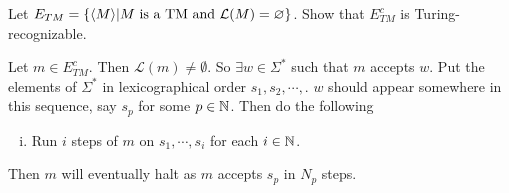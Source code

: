 \begin{problem}[Sipser]
	Let $ E_{TM} = \{\langle M\rangle|\text{$ M $ is a TM and $ \mathcal{L}(M)=\varnothing $}\}$. Show that $ E_{TM}^c $ is Turing-recognizable.
\end{problem}
\begin{solution}
	Let $ m \in E_{TM}^c $. Then $ \mathcal{L}(m) \neq \emptyset $. So $ \exists w \in \Sigma^* $ such that $ m $ accepts $ w $. Put the elements of $ \Sigma^* $ in lexicographical order $ s_1,s_2,\cdots, $. $ w $ should appear somewhere in this sequence, say $ s_p $ for some $ p\in\mathbb{N} $. Then do the following
	\begin{enumerate}[(i)]
		\item Run $ i $ steps of $ m $ on $ s_1,\cdots,s_i $ for each $ i\in \mathbb{N} $.
	\end{enumerate}
	Then $ m $ will eventually halt as $ m $ accepts $ s_p $ in $ N_p $ steps.
\end{solution}

















